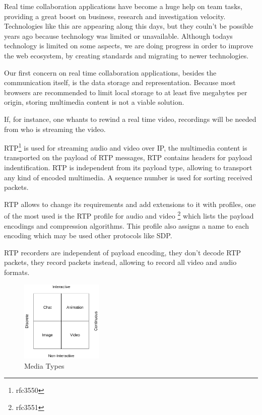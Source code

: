 
  Real time collaboration applications have become a huge help on team tasks, providing a great boost on business, research and investigation velocity. Technologies like this are appearing along this days, but they couln't be possible years ago because technology was limited or unavailable. Although todays technology is limited on some aspects, we are doing progress in order to improve the web ecosystem, by creating standards and migrating to newer technologies.

  Our first concern on real time collaboration applications, besides the communication itself, is the data storage and representation. Because most browsers are recommended to limit local storage to at least five megabytes per origin, storing multimedia content is not a viable solution.

  If, for instance, one whants to rewind a real time video, recordings will be needed from who is streaming the video. 

  \ac{RTP}\footnote{rfc3550} is used for streaming audio and video over \ac{IP}, the multimedia content is transported on the payload of \ac{RTP} messages, \ac{RTP} contains headers for payload indentification. \ac{RTP} is independent from its payload type, allowing to transport any kind of encoded multimedia. A sequence number is used for sorting received packets.

  \ac{RTP} allows to change its requirements and add extensions to it with profiles, one of the most used is the \ac{RTP} profile for audio and video \footnote{rfc3551} which lists the payload encodings and compression algorithms. This profile also assigns a name to each encoding which may be used other protocols like \ac{SDP}.

  \ac{RTP} recorders are independent of payload encoding, they don't decode \ac{RTP} packets, they record packets instead, allowing to record all video and audio formats.

\begin{figure}[H]
	\begin{center}
		\centering
		\includegraphics[width=0.35\textwidth]{figures/media_types.png}

	\caption{Media Types}
	\end{center}
\end{figure}

